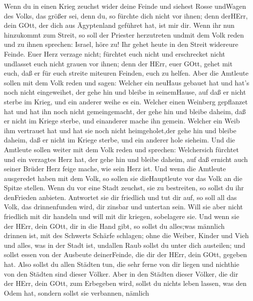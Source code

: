  Wenn du in einen Krieg zeuchst wider deine Feinde und
siehest Rosse undWagen des Volks, das größer sei, denn du, so fürchte
dich nicht vor ihnen; denn derHErr, dein GOtt, der dich aus Ägyptenland
geführet hat, ist mir dir.  Wenn ihr nun hinzukommt zum
Streit, so soll der Priester herzutreten undmit dem Volk reden
 und zu ihnen sprechen: Israel, höre zu! Ihr gehet heute in
den Streit widereure Feinde. Euer Herz verzage nicht; fürchtet euch
nicht und erschrecket nicht undlasset euch nicht grauen vor ihnen;
 denn der HErr, euer GOtt, gehet mit euch, daß er für euch
streite miteuren Feinden, euch zu helfen.  Aber die Amtleute
sollen mit dem Volk reden und sagen: Welcher ein neuHaus gebauet hat und
hat's noch nicht eingeweihet, der gehe hin und bleibe in seinemHause,
auf daß er nicht sterbe im Krieg, und ein anderer weihe es ein.
 Welcher einen Weinberg gepflanzet hat und hat ihn noch
nicht gemeingemacht, der gehe hin und bleibe daheim, daß er nicht im
Kriege sterbe, und einanderer mache ihn gemein.  Welcher ein
Weib ihm vertrauet hat und hat sie noch nicht heimgeholet,der gehe hin
und bleibe daheim, daß er nicht im Kriege sterbe, und ein anderer hole
sieheim.  Und die Amtleute sollen weiter mit dem Volk reden
und sprechen: Welchersich fürchtet und ein verzagtes Herz hat, der gehe
hin und bleibe daheim, auf daß ernicht auch seiner Brüder Herz feige
mache, wie sein Herz ist.  Und wenn die Amtleute ausgeredet
haben mit dem Volk, so sollen sie dieHauptleute vor das Volk an die
Spitze stellen.  Wenn du vor eine Stadt zeuchst, sie zu
bestreiten, so sollst du ihr denFrieden anbieten. 
Antwortet sie dir friedlich und tut dir auf, so soll all das Volk, das
drinnenfunden wird, dir zinsbar und untertan sein.  Will
sie aber nicht friedlich mit dir handeln und will mit dir kriegen,
sobelagere sie.  Und wenn sie der HErr, dein GOtt, dir in
die Hand gibt, so sollst du alles;was männlich drinnen ist, mit des
Schwerts Schärfe schlagen;  ohne die Weiber, Kinder und
Vieh und alles, was in der Stadt ist, undallen Raub sollst du unter dich
austeilen; und sollst essen von der Ausbeute deinerFeinde, die dir der
HErr, dein GOtt, gegeben hat.  Also sollst du allen Städten
tun, die sehr ferne von dir liegen und nichthie von den Städten sind
dieser Völker.  Aber in den Städten dieser Völker, die dir
der HErr, dein GOtt, zum Erbegeben wird, sollst du nichts leben lassen,
was den Odem hat,  sondern sollst sie verbannen, nämlich
